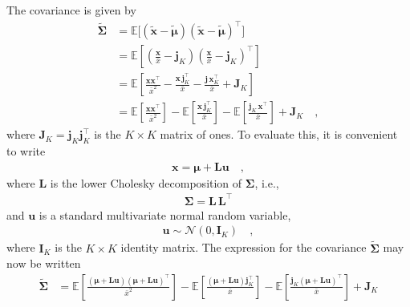 \documentclass[modern]{aastex62}
\begin{document}
The covariance is given by
%
\begin{align}
    \tilde{\pmb{\Sigma}}
     & =
    \mathbb{E}\big[ (\tilde{\mathbf{x}} - \tilde{\pmb{\mu}}) (\tilde{\mathbf{x}} - \tilde{\pmb{\mu}} )^\top \big]
    \nonumber \\[0.5em]
     & =
    \mathbb{E}\left[
        \left(\frac{\mathbf{x}}{\bar{x}} - \mathbf{j}_K\right)
        \left(\frac{\mathbf{x}}{\bar{x}} - \mathbf{j}_K\right)^\top
        \right]
    \nonumber \\[0.5em]
     & =
    \mathbb{E}\left[
        \frac{\mathbf{x}\mathbf{x}^\top}{\bar{x}^2}
        -
        \frac{\mathbf{x}\,\mathbf{j}_K^\top}{\bar{x}}
        -
        \frac{\mathbf{j}\,\mathbf{x}_K^\top}{\bar{x}}
        +
        \mathbf{J}_K
        \right]
    \nonumber \\[0.5em]
     & =
    \mathbb{E}\left[
        \frac{\mathbf{x}\mathbf{x}^\top}{\bar{x}^2}
        \right]
    -
    \mathbb{E}\left[
        \frac{\mathbf{x}\,\mathbf{j}_K^\top}{\bar{x}}
        \right]
    -
    \mathbb{E}\left[
        \frac{\mathbf{j}_K\,\mathbf{x}^\top}{\bar{x}}
        \right]
    +
    \mathbf{J}_K
    \quad,
\end{align}
%
where $\mathbf{J}_K = \mathbf{j}_K \mathbf{j}_K^\top$ is the $K\times K$ matrix of ones.
To evaluate this, it is convenient to write
%
\begin{align}
    \mathbf{x} = \pmb{\mu} + \mathbf{L} \mathbf{u}
    \quad,
\end{align}
%
where $\mathbf{L}$ is the lower Cholesky decomposition of $\pmb{\Sigma}$,
i.e.,
%
\begin{align}
    \pmb{\Sigma} = \mathbf{L}\,\mathbf{L}^\top
\end{align}
%
and $\mathbf{u}$ is a standard multivariate normal random variable,
%
\begin{align}
    \mathbf{u} \sim \mathcal{N}\left( 0, \mathbf{I}_K \right)
    \quad,
\end{align}
%
where $\mathbf{I}_K$ is the
$K \times K$ identity matrix.
The expression for the covariance $\tilde{\pmb{\Sigma}}$ may now be written
%
\begin{align}
    \label{eq:SigmaTildeExp}
    \tilde{\pmb{\Sigma}}
     & =
    \mathbb{E}\left[
        \frac{
            (\pmb{\mu} + \mathbf{L} \mathbf{u})(\pmb{\mu} + \mathbf{L} \mathbf{u})^\top
        }{
            \bar{x}^2
        }
        \right]
    -
    \mathbb{E}\left[
        \frac{
            (\pmb{\mu} + \mathbf{L} \mathbf{u})\mathbf{j}_K^\top
        }{
            \bar{x}
        }
        \right]
    -
    \mathbb{E}\left[
        \frac{
            \mathbf{j}_K(\pmb{\mu} + \mathbf{L} \mathbf{u})^\top
        }{
            \bar{x}
        }
        \right]
    +
    \mathbf{J}_K
\end{align}
\end{document}
